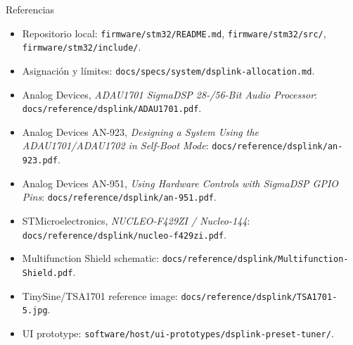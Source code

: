 \documentclass[aspectratio=169,11pt]{beamer}
\newcommand{\tightlist}{\setlength{\itemsep}{2pt}\setlength{\parskip}{0pt}}
\begin{document}
\begin{frame}{Referencias}
  \scriptsize
  \begin{itemize}\tightlist
    \item Repositorio local: \texttt{firmware/stm32/README.md}, \texttt{firmware/stm32/src/}, \texttt{firmware/stm32/include/}.
    \item Asignación y límites: \texttt{docs/specs/system/dsplink-allocation.md}.
    \item Analog Devices, \textit{ADAU1701 SigmaDSP 28-/56-Bit Audio Processor}: \texttt{docs/reference/dsplink/ADAU1701.pdf}.
    \item Analog Devices AN-923, \textit{Designing a System Using the ADAU1701/ADAU1702 in Self-Boot Mode}: \texttt{docs/reference/dsplink/an-923.pdf}.
    \item Analog Devices AN-951, \textit{Using Hardware Controls with SigmaDSP GPIO Pins}: \texttt{docs/reference/dsplink/an-951.pdf}.
    \item STMicroelectronics, \textit{NUCLEO-F429ZI / Nucleo-144}: \texttt{docs/reference/dsplink/nucleo-f429zi.pdf}.
    \item Multifunction Shield schematic: \texttt{docs/reference/dsplink/Multifunction-Shield.pdf}.
    \item TinySine/TSA1701 reference image: \texttt{docs/reference/dsplink/TSA1701-5.jpg}.
    \item UI prototype: \texttt{software/host/ui-prototypes/dsplink-preset-tuner/}.
  \end{itemize}
\end{frame}
\end{document}
